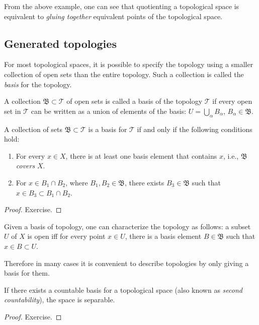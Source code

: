 From the above example, one can see that quotienting a topological space is equivalent to \emph{gluing together} equivalent points of the topological space.





\subsection{Generated topologies}

For most topological spaces, it is possible to specify the topology  using a smaller collection of open sets than the entire topology. Such a collection is called the \emph{basis} for the topology.

\begin{defn}[Basis]
A collection  $\mathfrak{B}\subset \mathcal{T}$ of open sets is called a basis of the topology $\mathcal{T}$ if every open set in $\mathcal{T}$ can be written as a union of elements of the basis: $U=\bigcup_\alpha B_\alpha$, $B_\alpha \in \mathfrak{B}$.
\end{defn}

\begin{prop}
A collection of sets $\mathfrak{B}\subset\mathcal{T}$ is a basis for $\mathcal{T}$ if and only if the following conditions hold:
\begin{enumerate}
    \item For every $x\in X$, there is at least one basis element that contains $x$, i.e., $\mathfrak{B}$ \emph{covers} $X$.
    \item For $x\in B_1 \cap B_2$, where $B_1,B_2\in\mathfrak{B}$, there exists $B_3\in\mathfrak{B}$ such that $x\in B_3\subset B_1\cap B_2 $.
\end{enumerate}
\end{prop}
\begin{proof}
Exercise.
\end{proof}
\begin{prop}\label{characterization of topology using basis}
Given a basis of topology, one can characterize the topology as follows: a subset $U$ of $X$ is open iff for every point $x\in U$, there is a basis element $B\in \mathfrak{B}$ such that $x\in B\subset U$.
\end{prop} 
Therefore in many cases it is convenient to describe topologies by only giving a basis for them.

\begin{prop}
If there exists a countable basis for a topological space (also known as \emph{second countability}), the space is separable.
\end{prop}
\begin{proof}
Exercise.
\end{proof}

